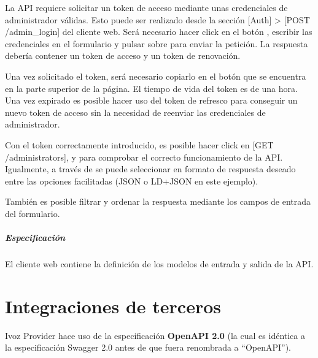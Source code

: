 \documentclass[letterpaper,10pt,spanish]{sphinxmanual}
\begin{document}

La API requiere solicitar un token de acceso mediante unas credenciales de administrador válidas. Esto puede ser realizado desde la sección {[}Auth{]} \textgreater{} {[}POST /admin\_login{]} del cliente web. Será necesario hacer click en el botón , escribir las credenciales en el formulario y pulsar sobre  para enviar la petición. La respuesta debería contener un token de acceso y un token de renovación.


Una vez solicitado el token, será necesario copiarlo en el botón  que se encuentra en la parte superior de la página. El tiempo de vida del token es de una hora. Una vez expirado es posible hacer uso del token de refresco para conseguir un nuevo token de acceso sin la necesidad de reenviar las credenciales de administrador.

Con el token correctamente introducido, es posible hacer click en {[}GET /administrators{]},  y  para comprobar el correcto funcionamiento de la API. Igualmente, a través de  se puede seleccionar en formato de respuesta deseado entre las opciones facilitadas (JSON o LD+JSON en este ejemplo).


También es posible filtrar y ordenar la respuesta mediante los campos de entrada del formulario.
\paragraph{Especificación}

El cliente web contiene la definición de los modelos de entrada y salida de la API.



\chapter{Integraciones de terceros}
\label{api_rest/integrations:third-party-integrations}\label{api_rest/integrations::doc}
Ivoz Provider hace uso de la especificación \textbf{OpenAPI 2.0} (la cual es idéntica a la especificación Swagger 2.0 antes de que fuera renombrada a ``OpenAPI'').
\end{document}
